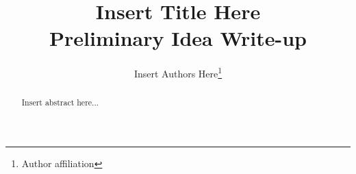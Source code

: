 \newcommand*{\MyHeaderPath}{..}%
\newcommand*{\PathToAssets}{../../assets}%
\newcommand*{\PathToOutput}{../../output/}%






\usepackage{setspace}
\doublespacing
\newcommand{\cpi}{\text{cpi}}




\title{
Insert Title Here
\\{\color{blue} \large Preliminary Idea Write-up}
}

\author{
Insert Authors Here\footnote{Author affiliation}
}
\begin{titlepage}
% 
\maketitle


\begin{abstract}
Insert abstract here...
\end{abstract}


\end{titlepage}

